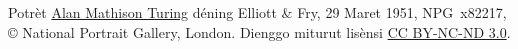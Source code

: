 Potrèt \href{http://www.npg.org.uk/collections/search/portrait/mw63680/Alan-Mathison-Turing?}{Alan
Mathison Turing} déning Elliott \& Fry, 29 Maret 1951, NPG~x82217,
\copyright{} National Portrait Gallery, London. Dienggo miturut
lisènsi \href{http://creativecommons.org/licenses/by-nc-nd/3.0/}{CC BY-NC-ND 3.0}.
